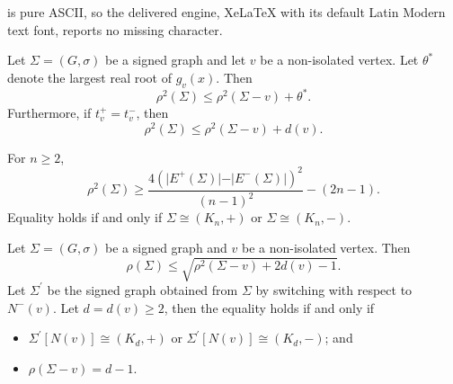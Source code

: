 \documentclass[10pt,a4paper]{amsart}
\begin{document}
is pure ASCII, so the delivered engine, XeLaTeX with its default Latin Modern text font, reports no missing character.
	\begin{theorem}\label{Spec_Rad_Theta}
		Let $\Sigma=(G,\sigma)$ be a signed graph and let $v$ be a non-isolated vertex. Let $\theta^{*}$ denote the largest real root of $g_v(x)$.
		Then
		\[
		\rho^{2}(\Sigma)\leq \rho^{2}(\Sigma-v)+\theta^{*}.
		\]
		Furthermore, if $t_v^+=t_v^-$, then
		\[
		\rho^{2}(\Sigma)\leq \rho^{2}(\Sigma-v)+d(v).
		\]
	\end{theorem}

	\begin{lemma}\label{Spec_Rad_lower}
		For $n \geq 2$,
		\[\rho^2(\Sigma)\geq \dfrac{4(\vert E^+(\Sigma)\vert-\vert E^-(\Sigma)\vert)^2}{(n-1)^2}-(2n-1).\]
		Equality holds if and only if $\Sigma\cong(K_n,+)$ or $\Sigma \cong(K_n,-)$.
	\end{lemma}

	\begin{theorem}\label{Spec_Rad_Bound1}
		Let $\Sigma=(G,\sigma) $ be a signed graph and $v$ be a non-isolated vertex.  Then \[\rho(\Sigma) \leq \sqrt{\rho^2(\Sigma-v)+2d(v)-1}.\]
		Let $\Sigma^\prime$ be the signed graph obtained from  $\Sigma$ by switching with respect to $N^{-}(v)$. Let $d=d(v) \ge 2$, then the equality holds if and only if
		\begin{itemize}
			\item[(a)] $\Sigma^\prime[N(v)]\cong (K_d,+)$ or
			$\Sigma^\prime[N(v)]\cong (K_d,-)$; and
			\item[(b)] $\rho(\Sigma-v)=d-1$.
		\end{itemize}
	\end{theorem}
\end{document}
